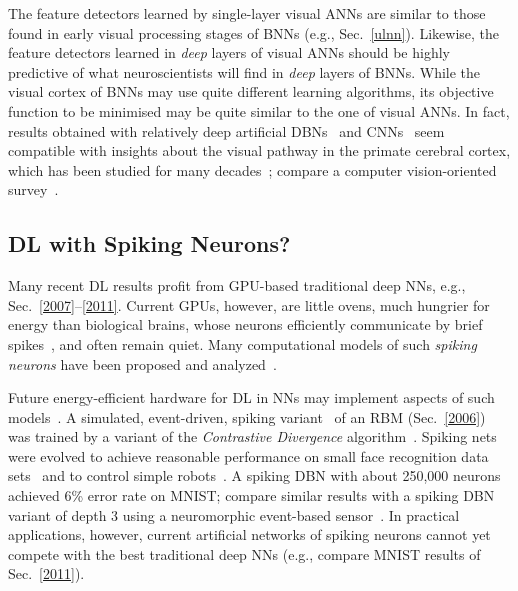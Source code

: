 \documentclass[letterpaper]{article}
\begin{document}
\begin{CJK*}{UTF8}{gbsn}
\begin{sloppypar}
The feature detectors learned by single-layer visual ANNs 
are similar to those found in early visual processing stages of BNNs
(e.g., Sec.~\ref{ulnn}).
Likewise, the feature detectors learned in {\em deep} layers of visual ANNs should be highly predictive of what neuroscientists will find in {\em deep} layers of BNNs. While the visual cortex of BNNs may use quite different learning algorithms, its objective function to be minimised may be quite similar to the one of visual ANNs. 
In fact, results obtained 
with relatively deep artificial DBNs~\citep{lee2007sparse} and CNNs~\citep{Yamins2013}
seem compatible with insights about
the visual pathway in the primate cerebral cortex,
which has been studied for many decades~\citep[e.g.,][]{hubel1968,perrett1982,desimone1984,felleman1991,perrett1992,Tanaka:94,logothetis1995,Bichot:05,poggio2005,lennie2005,connor2007,kriegeskorte2008,dicarlo2012}; compare a 
computer vision-oriented survey~\citep{kruger2013}.



\subsection{DL with Spiking Neurons?}
\label{spiking}
Many recent DL results profit from GPU-based traditional deep NNs, e.g., Sec.~\ref{2007}--\ref{2011}. Current GPUs, however, are little ovens, much hungrier for energy than biological brains, whose neurons efficiently communicate by brief spikes~\citep{hodgkin1952,fitzhugh1961,nagumo1962}, 
and often remain quiet. Many computational models of such 
{\em spiking neurons} have been proposed and analyzed~\citep[e.g.,][]{gerstner1992,zipser1993,stemmler1996,tsodyks1996,maex1996,maass1996,maass1997,kistler1997,amit1997,tsodyks1998,kempter1999,song2000,stoop2000,brunel2000,bohte2002,gerstnerbook,izhikevich2003,seung2003,deco2005,brette2007,brea2013,nessler2013,kasabov2014,maass2014,rezende2014}.

Future energy-efficient hardware for DL in NNs may implement aspects of such models~\citep[e.g.,][]{liu2001,roggen2003,glackin2005,schemmel2006,fieres2008,khan2008,serrano2009,jin2010,indiveri2011,neil2014,merolla2014}. 
A simulated, event-driven, spiking variant~\citep{nefti2014} of an RBM (Sec.~\ref{2006})
was trained by a variant of the
{\em Contrastive Divergence} algorithm~\citep{hinton:2002}.
Spiking nets were evolved to achieve reasonable performance on small face recognition data sets~\citep{wysoski2010} and to control simple robots~\citep{floreano2001,hagras2004}.
A spiking DBN with about 250,000 neurons~\citep[as part of a larger NN;][]{eliasmith2012,eliasmith2013} 
achieved 6\% error rate on MNIST;
compare similar results with a spiking DBN variant of depth 3 using a neuromorphic event-based sensor~\citep{oconnor2013}. 
In practical applications, however,
current artificial networks of
spiking neurons cannot yet compete with the best traditional deep NNs
(e.g., compare MNIST results of Sec.~\ref{2011}). 


\end{sloppypar}
\end{CJK*}
\end{document}

